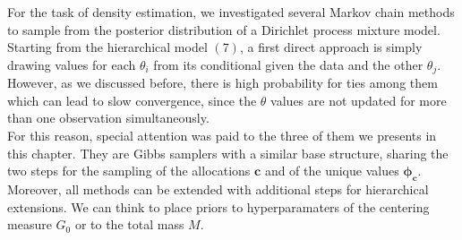 For the task of density estimation, we investigated several Markov chain methods to sample from the posterior distribution of a Dirichlet process mixture model. \\
Starting from the hierarchical model $(7)$, a first direct approach is simply drawing values for each $\theta_i$ from its conditional given the data and the other $\theta_j$. %
However, as we discussed before, there is high probability for ties among them which can lead to slow convergence, since the $\theta$ values are not updated for more than one observation simultaneously. \\
For this reason, special attention was paid to the three of them we presents in this chapter.
They are Gibbs samplers with a similar base structure, sharing the two steps for the sampling of the allocations $\mathbf{c}$ and of the unique values $\mathbf{\phi_c}$. \\
Moreover, all methods can be extended with additional steps for hierarchical extensions.
We can think to place priors to hyperparamaters of the centering measure $G_0$ or to the total mass $M$.

